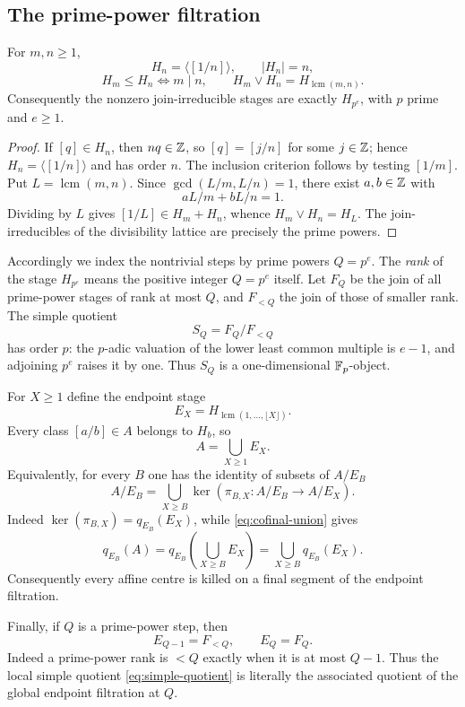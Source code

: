 \subsection{The prime-power filtration}

\begin{lemma}\label{lem:torsion-filtration}
For $m,n\ge1$,
\[
H_n=\langle[1/n]\rangle,
\qquad |H_n|=n,
\]
\[
H_m\le H_n\iff m\mid n,
\qquad
H_m\vee H_n=H_{\operatorname{lcm}(m,n)}.
\]
Consequently the nonzero join-irreducible stages are exactly $H_{p^e}$, with $p$ prime and $e\ge1$.
\end{lemma}

\begin{proof}
If $[q]\in H_n$, then $nq\in\mathbb Z$, so $[q]=[j/n]$ for some $j\in\mathbb Z$; hence $H_n=\langle[1/n]\rangle$ and has order $n$.  The inclusion criterion follows by testing $[1/m]$.  Put $L=\operatorname{lcm}(m,n)$.  Since $\gcd(L/m,L/n)=1$, there exist $a,b\in\mathbb Z$ with
\[
aL/m+bL/n=1.
\]
Dividing by $L$ gives $[1/L]\in H_m+H_n$, whence $H_m\vee H_n=H_L$.  The join-irreducibles of the divisibility lattice are precisely the prime powers.
\end{proof}

Accordingly we index the nontrivial steps by prime powers $Q=p^e$.  The \emph{rank} of the stage $H_{p^e}$ means the positive integer $Q=p^e$ itself.  Let $F_Q$ be the join of all prime-power stages of rank at most $Q$, and $F_{<Q}$ the join of those of smaller rank.  The simple quotient
\begin{equation}\label{eq:simple-quotient}
S_Q=F_Q/F_{<Q}
\end{equation}
has order $p$: the $p$-adic valuation of the lower least common multiple is $e-1$, and adjoining $p^e$ raises it by one.  Thus $S_Q$ is a one-dimensional $\mathbb F_p$-object.

For $X\ge1$ define the endpoint stage
\begin{equation}\label{eq:endpoint-stage}
E_X=H_{\operatorname{lcm}(1,\ldots,\lfloor X\rfloor)}.
\end{equation}
Every class $[a/b]\in A$ belongs to $H_b$, so
\begin{equation}\label{eq:cofinal-union}
A=\bigcup_{X\ge1}E_X.
\end{equation}
Equivalently, for every $B$ one has the identity of subsets of $A/E_B$
\begin{equation}\label{eq:centre-kernel-union}
A/E_B
=
\bigcup_{X\ge B}\ker\!\left(\pi_{B,X}:A/E_B\to A/E_X\right).
\end{equation}
Indeed $\ker(\pi_{B,X})=q_{E_B}(E_X)$, while \eqref{eq:cofinal-union} gives
\[
q_{E_B}(A)
=q_{E_B}\!\left(\bigcup_{X\ge B}E_X\right)
=\bigcup_{X\ge B}q_{E_B}(E_X).
\]
Consequently every affine centre is killed on a final segment of the endpoint filtration.

Finally, if $Q$ is a prime-power step, then
\begin{equation}\label{eq:endpoint-current-step}
E_{Q-1}=F_{<Q},
\qquad
E_Q=F_Q.
\end{equation}
Indeed a prime-power rank is $<Q$ exactly when it is at most $Q-1$.  Thus the local simple quotient \eqref{eq:simple-quotient} is literally the associated quotient of the global endpoint filtration at $Q$.
